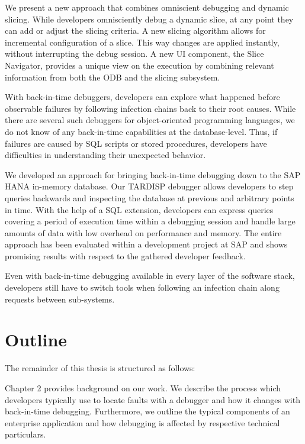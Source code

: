 We present a new approach that combines omniscient debugging and dynamic slicing. 
While developers omnisciently debug a dynamic slice, at any point they can add or adjust the slicing criteria.
A new slicing algorithm allows for incremental configuration of a slice. 
This way changes are applied instantly, without interrupting the debug session. 
A new UI component, the Slice Navigator, provides a unique view on the execution by combining relevant information from both the ODB and the slicing subsystem.


With back-in-time debuggers, developers can explore what happened before observable failures by following infection chains back to their root causes. 
While there are several such debuggers for object-oriented programming languages, we do not know of any back-in-time capabilities at the database-level.
Thus, if failures are caused by SQL scripts or stored procedures, developers have difficulties in understanding their unexpected behavior.

We developed an approach for bringing back-in-time debugging down to the SAP HANA in-memory database.
Our TARDISP debugger allows developers to step queries backwards and inspecting the database at previous and arbitrary points in time. 
With the help of a SQL extension, developers can express queries covering a period of execution time within a debugging session and handle large amounts of data with low overhead on performance and memory. 
The entire approach has been evaluated within a development project at SAP and shows promising results with respect to the gathered developer feedback.


Even with back-in-time debugging available in every layer of the software stack, developers still have to switch tools when following an infection chain along requests between sub-systems.

\section{Outline}

The remainder of this thesis is structured as follows:

Chapter 2 provides background on our work.
We describe the process which developers typically use to locate faults with a debugger and how it changes with back-in-time debugging.
Furthermore, we outline the typical components of an enterprise application and how debugging is affected by respective technical particulars.

